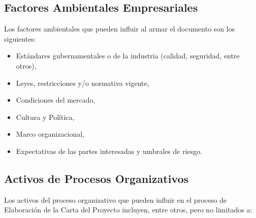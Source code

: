 \documentclass[letterpaper,12pt,openright,oneside]{article}
\theoremstyle{plain}
\begin{document}
\subsection*{Factores Ambientales Empresariales}

Los factores ambientales que pueden influir al armar el documento son los siguientes:

\begin{itemize}
    \item Estándares gubernamentales o de la industria (calidad, seguridad, entre otros),
    \item Leyes, restricciones y/o normativa vigente,
    \item Condiciones del mercado,
    \item Cultura y Política,
    \item Marco organizacional,
    \item Expectativas de las partes interesadas y umbrales de riesgo.
\end{itemize}
% 
% 
\subsection*{Activos de Procesos Organizativos}

Los activos del proceso organizativo que pueden influir en el proceso de Elaboración de la Carta del Proyecto incluyen, entre otros, pero no limitados a:
\end{document}
